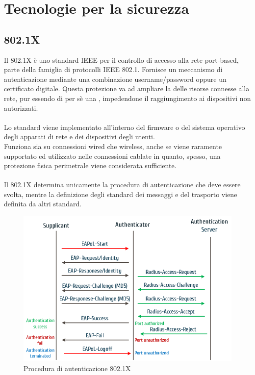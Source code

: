\documentclass[Tesi.tex]{subfiles}
\begin{document}
\newpage
\section{Tecnologie per la sicurezza}
\subsection{802.1X}
Il 802.1X è uno standard IEEE per il controllo di accesso alla rete port-based, parte della famiglia di protocolli IEEE 802.1. Fornisce un meccanismo di autenticazione mediante una combinazione username/password oppure un certificato digitale.
Questa protezione va ad ampliare la  delle risorse connesse alla rete, pur essendo di per sè una , impedendone il raggiungimento ai dispositivi non autorizzati. \\\\
Lo standard viene implementato all'interno del firmware o del sistema operativo degli apparati di rete e dei dispositivi degli utenti.\\
Funziona sia su connessioni wired che wireless, anche se viene raramente supportato ed utilizzato nelle connessioni cablate in quanto, spesso, una protezione fisica perimetrale viene considerata sufficiente. \\\\
Il 802.1X determina unicamente la procedura di autenticazione che deve essere svolta, mentre la definizione degli standard dei messaggi e del trasporto viene definita da altri standard.

\begin{figure}[H]
	\centering
	\includegraphics[width=0.78\linewidth]{"images/8021x-Authentication-message-flow"}
	\caption{Procedura di autenticazione 802.1X}
	\label{fig:Procedura di autenticazione 802.1X}
\end{figure}
\end{document}
